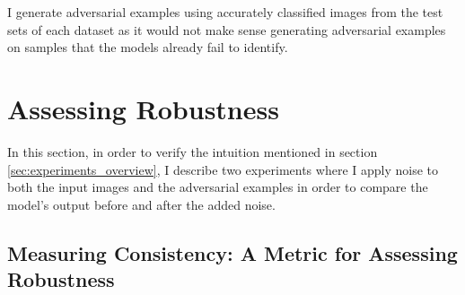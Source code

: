 I generate adversarial examples using accurately classified images from the test
sets of each dataset as it would not make sense generating adversarial examples
on samples that the models already fail to identify.

\section{Assessing Robustness}
\label{sec:robustness}

In this section, in order to verify the intuition mentioned in section
\ref{sec:experiments_overview}, I describe two experiments where I apply noise
to both the input images and the adversarial examples in order to compare the
model's output before and after the added noise.


\subsection{Measuring Consistency: A Metric for Assessing Robustness}
\label{sub:consistency}

